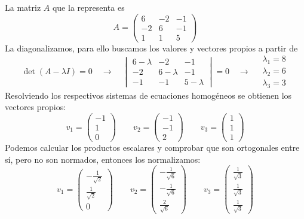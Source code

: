La matriz \(A\) que la representa es
\[
  A = \begin{pmatrix}
    6 & -2 & -1 \\
    -2 & 6 & -1 \\
    1 & 1 & 5
  \end{pmatrix}
\]
La diagonalizamos, para ello buscamos los valores y vectores propios a partir de 
\[
\det(A-\lambda I) = 0 \quad \rightarrow \quad \begin{vmatrix}
  6-\lambda & -2 & -1 \\
  -2 & 6-\lambda & -1 \\
  -1 & -1 & 5-\lambda
\end{vmatrix}= 0 \quad \rightarrow \quad \begin{array}{c}
  \lambda_1 = 8 \\
  \lambda_2 = 6 \\
  \lambda_3 = 3  
\end{array}
\]
Resolviendo los respectivos sistemas de ecuaciones homogéneos se obtienen los vectores propios:
\[
  v_1 = \begin{pmatrix}
    -1 \\ 1 \\ 0
  \end{pmatrix} \qquad v_2 = \begin{pmatrix}
    -1 \\ -1 \\ 2
  \end{pmatrix} \qquad v_3 = \begin{pmatrix}
    1 \\ 1 \\ 1
  \end{pmatrix}
\]
Podemos calcular los productos escalares y comprobar que son ortogonales entre sí, pero no son normados, entonces los normalizamos:
\[
  v_1 = \begin{pmatrix}
    -\frac{1}{\sqrt{2}} \\ \frac{1}{\sqrt{2}} \\ 0
  \end{pmatrix} \qquad v_2 = \begin{pmatrix}
    -\frac{1}{\sqrt{6}} \\ -\frac{1}{\sqrt{6}} \\ \frac{2}{\sqrt{6}}
  \end{pmatrix} \qquad v_3 = \begin{pmatrix}
    \frac{1}{\sqrt{3}} \\ \frac{1}{\sqrt{3}} \\ \frac{1}{\sqrt{3}}
  \end{pmatrix}
\]
